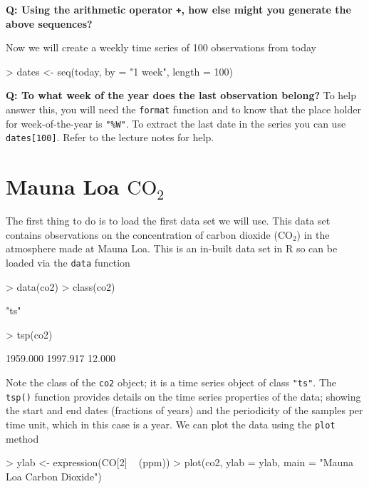 \documentclass[a4paper,10pt]{article}
\newcommand{\R}{\textsf{R}\xspace}
\begin{document}
\textbf{Q: Using the arithmetic operator \texttt{+}, how else might you generate the above sequences?}

Now we will create a weekly time series of 100 observations from today
\begin{Schunk}
\begin{Sinput}
> dates <- seq(today, by = "1 week", length = 100)
\end{Sinput}
\end{Schunk}

\textbf{Q: To what week of the year does the last observation belong?} To help answer this, you will need the \texttt{format} function and to know that the place holder for week-of-the-year is \texttt{"\%W"}. To extract the last date in the series you can use \texttt{dates[100]}. Refer to the lecture notes for help.

\section{Mauna Loa $\mathrm{CO_2}$}
The first thing to do is to load the first data set we will use. This data set contains observations on the concentration of carbon dioxide ($\mathrm{CO_2}$) in the atmosphere made at Mauna Loa. This is an in-built data set in \R so can be loaded via the \texttt{data} function
\begin{Schunk}
\begin{Sinput}
> data(co2)
> class(co2)
\end{Sinput}
\begin{Soutput}
[1] "ts"
\end{Soutput}
\begin{Sinput}
> tsp(co2)
\end{Sinput}
\begin{Soutput}
[1] 1959.000 1997.917   12.000
\end{Soutput}
\end{Schunk}
Note the class of the \texttt{co2} object; it is a time series object of class \texttt{"ts"}. The \texttt{tsp()} function provides details on the time series properties of the data; showing the start and end dates (fractions of years) and the periodicity of the samples per time unit, which in this case is a year. We can plot the data using the \texttt{plot} method
\begin{Schunk}
\begin{Sinput}
> ylab <- expression(CO[2] ~ (ppm))
> plot(co2, ylab = ylab, main = "Mauna Loa Carbon Dioxide")
\end{Sinput}
\end{Schunk}
\end{document}
